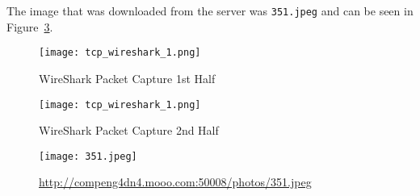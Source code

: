 The image that was downloaded from the server was \texttt{351.jpeg} and can be seen in Figure~\ref{fig:mooo}.
\clearpage

\begin{figure}[p]
    \centering
    \caption[tcp1]{WireShark Packet Capture 1st Half}\label{fig:tcp1}
    \texttt{[image: tcp\_wireshark\_1.png]}
\end{figure}

\begin{figure}[p]
    \centering
    \caption[tcp2]{WireShark Packet Capture 2nd Half}\label{fig:tcp2}
    \texttt{[image: tcp\_wireshark\_1.png]}
\end{figure}

\clearpage

\begin{figure}[htp]
    \centering
    \caption[mooo]{\url{http://compeng4dn4.mooo.com:50008/photos/351.jpeg}}\label{fig:mooo}
    \texttt{[image: 351.jpeg]}
\end{figure}
